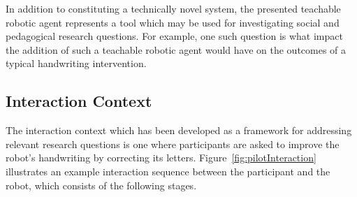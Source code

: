 \documentclass{sig-alternate}
\begin{document}
In addition to constituting a technically novel system, the presented teachable
robotic agent represents a tool which may be used for investigating social and
pedagogical research questions. For example, one such question is what impact the addition of
such a teachable robotic agent would have on the outcomes of a typical
handwriting intervention. 

\subsection{Interaction Context}

The interaction context which has been developed as a framework for addressing
relevant research questions is one where participants are asked to improve the robot's
handwriting by correcting its letters. Figure~\ref{fig:pilotInteraction}
illustrates an example interaction sequence between the participant and the
robot, which consists of the following stages.
\end{document}

